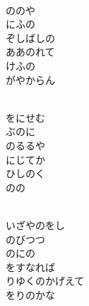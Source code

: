 \documentclass[10pt,b5j]{tarticle} %
\begin{document}
\vspace{1.5em} %
\newcommand{\linespace}{0.5em} %
\newcommand{\blocksize}{0.5\hsize} %
\newcommand{\itemmargin}{6em} %
\begin{enumerate} %
    \setlength{\itemindent}{\itemmargin} %
    \begin{minipage}[c]{\blocksize}
    
        \vspace{\linespace}
        \item~\\
        ののや\\
        にふの\\
        ぞしばしの\\
        ああのれて\\
        けふの\\
        がやからん
        
        \vspace{\linespace}
        \item~\\
        をにせむ\\
        ぶのに\\
        のるるや\\
        にじてか\\
        ひしのく\\
        のの
        
        \vspace{\linespace}
        \item~\\
        いざやのをし\\
        のびつつ\\
        のにの\\
        をすなれば\\
        りゆくのかげえて\\
        をりのかな
        

\end{minipage}
\end{enumerate}
\end{document}
